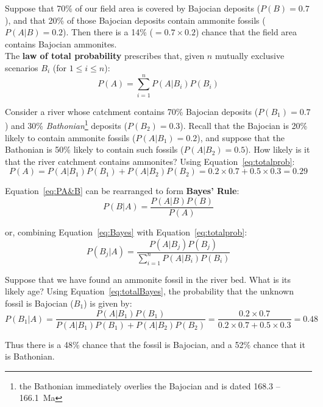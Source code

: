 Suppose that 70\% of our field area is covered by Bajocian deposits
($P(B)=0.7$), and that 20\% of those Bajocian deposits contain
ammonite fossils ($P(A|B)=0.2$). Then there is a 14\%
($=0.7\times{0.2}$) chance that the field area contains Bajocian
ammonites.\\

The \textbf{law of total probability} prescribes that, given $n$
mutually exclusive scenarios $B_i$ (for $1\leq{i}\leq{n}$):
\begin{equation}
  P(A) = \sum\limits_{i=1}^{n} P(A|B_i) P(B_i)
  \label{eq:totalprob}
\end{equation}

Consider a river whose catchment contains 70\% Bajocian deposits
($P(B_1)=0.7$) and 30\% \emph{Bathonian}\footnote{the Bathonian
  immediately overlies the Bajocian and is dated 168.3 -- 166.1~Ma}
deposits ($P(B_2)=0.3$). Recall that the Bajocian is 20\% likely to
contain ammonite fossils ($P(A|B_1)=0.2$), and suppose that the
Bathonian is 50\% likely to contain such fossils ($P(A|B_2)=0.5$).
How likely is it that the river catchment contains ammonites? Using
Equation~\ref{eq:totalprob}:
\[
P(A) = P(A|B_1) P(B_1) + P(A|B_2) P(B_2) =
0.2 \times 0.7 + 0.5 \times 0.3 = 0.29
\]

Equation~\ref{eq:PA&B} can be rearranged to form \textbf{Bayes' Rule}:
\begin{equation}
  P(B|A) = \frac{P(A|B) P(B)}{P(A)}
  \label{eq:Bayes}
\end{equation}

\noindent or, combining Equation~\ref{eq:Bayes} with
Equation~\ref{eq:totalprob}:
\begin{equation}
  P(B_j|A) = \frac{P(A|B_j) P(B_j)}{\sum\limits_{i=1}^{n}P(A|B_i) P(B_i)}
  \label{eq:totalBayes}
\end{equation}

Suppose that we have found an ammonite fossil in the river bed.  What
is its likely age? Using Equation~\ref{eq:totalBayes}, the probability
that the unknown fossil is Bajocian ($B_1$) is given by:
\[
  P(B_1|A) = \frac{P(A|B_1) P(B_1)}{P(A|B_1) P(B_1) + P(A|B_2) P(B_2)} = 
   \frac{0.2 \times 0.7}{0.2 \times 0.7 + 0.5 \times 0.3} = 0.48
\]

Thus there is a 48\% chance that the fossil is Bajocian, and a 52\%
chance that it is Bathonian.
